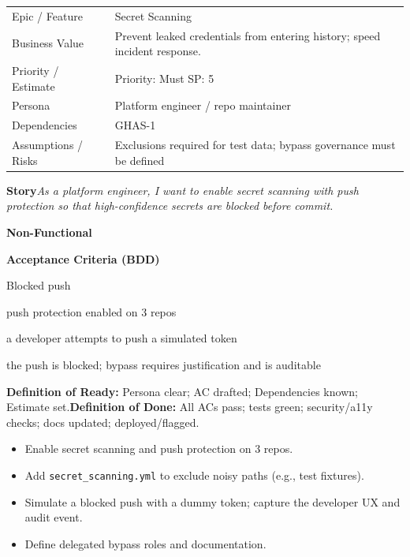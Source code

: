 \documentclass[11pt,a4paper]{article}
\newcommand{\cb}{\(\square\)}
\newenvironment{GHASCard}[2]{%
  \begin{tcolorbox}[ghascard,title={\ghasheader{#1 --- #2}}]
  \small
}{%
  \end{tcolorbox}
}
\newenvironment{GHASTasks}{%
  \begin{tcolorbox}[ghastasks]
  \small
  \begin{itemize}[label=\cb, leftmargin=*, labelsep=0.6em]
}{%
  \end{itemize}
  \end{tcolorbox}
}
\newcommand{\DoR}{\textbf{Definition of Ready:} Persona clear; AC drafted; Dependencies known; Estimate set.}
\newcommand{\DoD}{\textbf{Definition of Done:} All ACs pass; tests green; security/a11y checks; docs updated; deployed/flagged.}
\begin{document}
\begin{GHASCard}{GHAS-4}{Secret Scanning \& Push Protection}
\begin{tabularx}{\linewidth}{L V}
Epic / Feature & Secret Scanning \tabularnewline
Business Value & Prevent leaked credentials from entering history; speed incident response. \tabularnewline
Priority / Estimate & Priority: Must \quad SP: 5 \tabularnewline
Persona & Platform engineer / repo maintainer \tabularnewline
Dependencies & GHAS-1 \tabularnewline
Assumptions / Risks & Exclusions required for test data; bypass governance must be defined \tabularnewline
\end{tabularx}

\medskip
\textbf{Story}\quad \emph{As a platform engineer, I want to enable secret scanning with push protection so that high-confidence secrets are blocked before commit.}

\medskip
\textbf{Non-Functional}\quad
{}\ \ 

\medskip
\textbf{Acceptance Criteria (BDD)}
\begin{description}[leftmargin=2.7cm, labelwidth=2.6cm, style=nextline]
  \item[\textbf{Scenario}] Blocked push
  \item[\textbf{Given}] push protection enabled on 3 repos
  \item[\textbf{When}] a developer attempts to push a simulated token
  \item[\textbf{Then}] the push is blocked; bypass requires justification and is auditable
\end{description}

\medskip
\DoR\quad\textbullet\quad\DoD
\end{GHASCard}

\begin{GHASTasks}
\item Enable secret scanning and push protection on 3 repos.
\item Add \texttt{secret\_scanning.yml} to exclude noisy paths (e.g., test fixtures).
\item Simulate a blocked push with a dummy token; capture the developer UX and audit event.
\item Define delegated bypass roles and documentation.
\end{GHASTasks}
\clearpage
\end{document}
